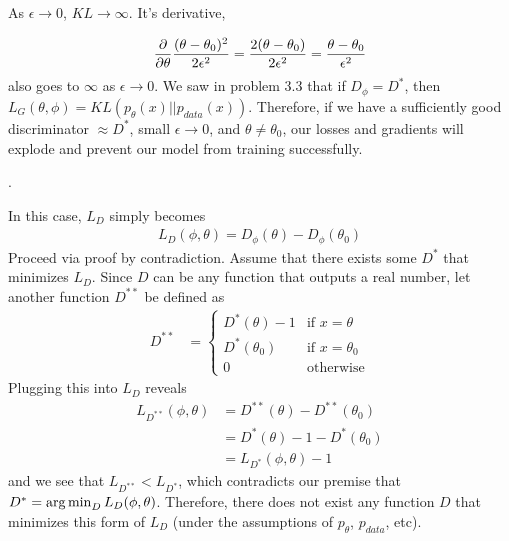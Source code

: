 \documentclass[11pt]{article}
\newcommand\p{\noindent}
\newcommand\myspace[1][]{\vspace{#1\bigskipamount}\Needspace{10\baselineskip}}
\newcommand\bluesec[2][]{\myspace[#1] \p \blue{#2}}
\begin{document}
As $\epsilon \to 0$, $KL \to \infty$. It's derivative,

\begin{align}
	\frac{\partial }{\partial \theta} \frac{(\theta - \theta_0)^2}{2\epsilon^2}
		= \frac{2(\theta - \theta_0)}{2\epsilon^2} 
		= \frac{\theta - \theta_0}{\epsilon^2}
\end{align}
also goes to $\infty$ as $\epsilon \to 0$. We saw in problem 3.3 that if $D_{\phi} = D^*$, then $L_G(\theta, \phi) = KL(p_\theta(x) || p_{data}(x))$. Therefore, if we have a sufficiently good discriminator $\approx D^*$, small $\epsilon \to 0$, and $\theta \ne \theta_0$, our losses and gradients will explode and prevent our model from training successfully.
	
	
\clearpage
\bluesec[10]{Part 3}. 

In this case, $L_D$ simply becomes
\begin{align}
	L_D(\phi, \theta) = D_{\phi}(\theta) - D_{\phi}(\theta_0)
\end{align}
Proceed via proof by contradiction. Assume that there exists some $D^*$ that minimizes $L_D$. Since $D$ can be any function that outputs a real number, let another function $D^{**}$ be defined as
\begin{align}
	D^{**}
		&= \begin{cases}
			D^*(\theta) - 1 & \text{if } x = \theta \\
			D^*(\theta_0) & \text{if } x= \theta_0 \\
			0 & \text{otherwise}
		\end{cases}
\end{align}
Plugging this into $L_D$ reveals
\begin{align}
	L_{D^{**}}(\phi, \theta)
		&= D^{**}(\theta) - D^{**}(\theta_0) \\
		&= D^{*}(\theta) - 1 - D^*(\theta_0) \\
		&= L_{D^*}(\phi, \theta) - 1
\end{align}
and we see that $L_{D^{**}} < L_{D^*}$, which contradicts our premise that $D^* = \operatorname*{arg\,min}_{D} L_D(\phi, \theta)$. Therefore, there does not exist any function $D$ that minimizes this form of $L_D$ (under the assumptions of $p_{\theta}$, $p_{data}$, etc). 
	
\end{document}

